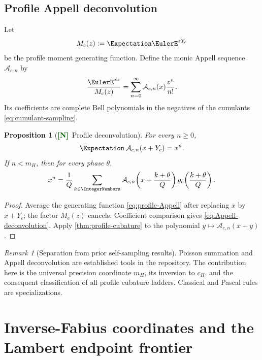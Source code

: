 \documentclass[11pt]{article}
\numberwithin{equation}{section}
\newtheorem{proposition}[theorem]{Proposition}
\theoremstyle{definition}
\theoremstyle{remark}
\newtheorem{remark}[theorem]{Remark}
\newcommand{\New}{\textcolor{darkgreen}{\textsf{\textbf{[N]}}}}
\begin{document}
\subsection{Profile Appell deconvolution}

Let
\begin{equation}
 M_c(z):=\Expectation\EulerE^{zY_c}
\end{equation}
be the profile moment generating function.  Define the monic Appell sequence
$\mathcal A_{c,n}$ by
\begin{equation}
 \frac{\EulerE^{xz}}{M_c(z)}
 =\sum_{n=0}^{\infty}\mathcal A_{c,n}(x)\frac{z^n}{n!}.
 \label{eq:profile-Appell}
\end{equation}
Its coefficients are complete Bell polynomials in the negatives of the
cumulants \eqref{eq:cumulant-sampling}.

\begin{proposition}[\New\ Profile deconvolution]
\label{prop:profile-Appell}
For every $n\ge0$,
\begin{equation}
 \Expectation\,\mathcal A_{c,n}(x+Y_c)=x^n.
 \label{eq:Appell-deconvolution}
\end{equation}
If $n<m_H$, then for every phase $\theta$,
\begin{equation}
 x^n=\frac1Q\sum_{k\in\IntegerNumbers}
 \mathcal A_{c,n}\!\left(x+\frac{k+\theta}{Q}\right)
 g_c\!\left(\frac{k+\theta}{Q}\right).
 \label{eq:Appell-comb-reconstruction}
\end{equation}
\end{proposition}

\begin{proof}
Average the generating function \eqref{eq:profile-Appell} after replacing $x$
by $x+Y_c$; the factor $M_c(z)$ cancels.  Coefficient comparison gives
\eqref{eq:Appell-deconvolution}.  Apply \cref{thm:profile-cubature} to the
polynomial $y\mapsto\mathcal A_{c,n}(x+y)$.
\end{proof}

\begin{remark}[Separation from prior self-sampling results]
Poisson summation and Appell deconvolution are established tools in the
repository.  The contribution here is the universal precision coordinate
$m_H$, its inversion to $c_H$, and the consequent classification of all
profile cubature ladders.  Classical and Pascal rules are specializations.
\end{remark}

\section{Inverse-Fabius coordinates and the Lambert endpoint frontier}
\label{sec:inverse-lambert}
\end{document}
